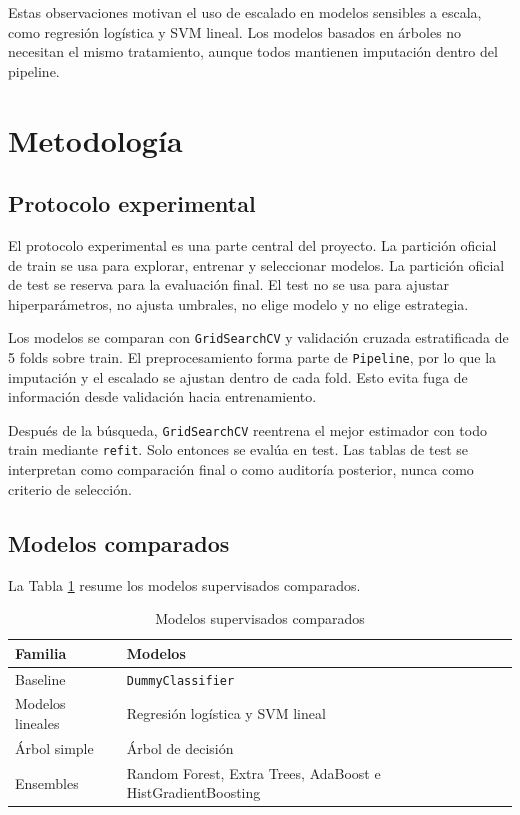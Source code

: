 \documentclass[11pt,a4paper]{article}
\begin{document}
Estas observaciones motivan el uso de escalado en modelos sensibles a escala, como regresión logística y SVM lineal. Los modelos basados en árboles no necesitan el mismo tratamiento, aunque todos mantienen imputación dentro del pipeline.

\section{Metodología}
\label{sec_metodologia}

\subsection{Protocolo experimental}

El protocolo experimental es una parte central del proyecto. La partición oficial de train se usa para explorar, entrenar y seleccionar modelos. La partición oficial de test se reserva para la evaluación final. El test no se usa para ajustar hiperparámetros, no ajusta umbrales, no elige modelo y no elige estrategia.

Los modelos se comparan con \texttt{GridSearchCV} y validación cruzada estratificada de 5 folds sobre train. El preprocesamiento forma parte de \texttt{Pipeline}, por lo que la imputación y el escalado se ajustan dentro de cada fold. Esto evita fuga de información desde validación hacia entrenamiento.

Después de la búsqueda, \texttt{GridSearchCV} reentrena el mejor estimador con todo train mediante \texttt{refit}. Solo entonces se evalúa en test. Las tablas de test se interpretan como comparación final o como auditoría posterior, nunca como criterio de selección.

\subsection{Modelos comparados}

La Tabla \ref{tab_modelos} resume los modelos supervisados comparados.

\begin{table}[H]
\centering
\caption{Modelos supervisados comparados}
\label{tab_modelos}
\small
\begin{tabular}{@{}lp{}@{}}
\toprule
\textbf{Familia} & \textbf{Modelos}\\
\midrule
Baseline & \texttt{DummyClassifier}\\
Modelos lineales & Regresión logística y SVM lineal\\
Árbol simple & Árbol de decisión\\
Ensembles & Random Forest, Extra Trees, AdaBoost e HistGradientBoosting\\
\bottomrule
\end{tabular}
\end{table}
\end{document}
